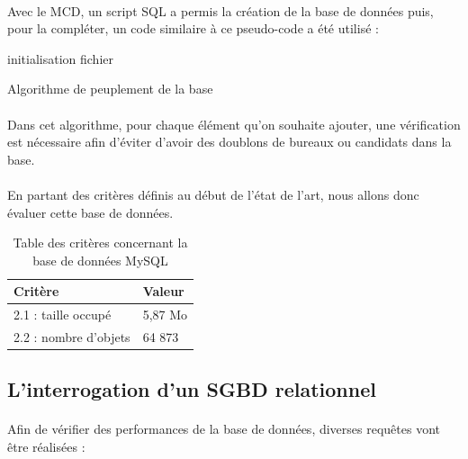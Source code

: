\paragraph{}Avec le MCD, un script SQL a permis la création de la base de données puis, pour la compléter, un code similaire à ce pseudo-code a été utilisé :\newline
\begin{algorithm}[H]
 initialisation fichier\;
 \caption{Algorithme de peuplement de la base}
\end{algorithm}
\paragraph{}Dans cet algorithme, pour chaque élément qu'on souhaite ajouter, une vérification est nécessaire afin d'éviter d'avoir des doublons de bureaux ou candidats dans la base.

\paragraph{}En partant des critères définis au début de l'état de l'art, nous allons donc évaluer cette base de données.
\begin{table}[h!]
    \centering
	\begin{tabular}{|p{5cm}|p{7cm}|} 
  	\hline
  	\textbf{Critère} & \textbf{Valeur} \\
  	\hline
  	2.1 : taille occupé & 5,87 Mo \\
  	\hline
  	2.2 : nombre d'objets & 64 873 \\
  	\hline
	\end{tabular}
    \caption{Table des critères concernant la base de données MySQL}
    \label{tab:critere-mysqlbase}
\end{table}
\subsection{L'interrogation d'un SGBD relationnel}
\paragraph{}Afin de vérifier des performances de la base de données, diverses requêtes vont être réalisées :
